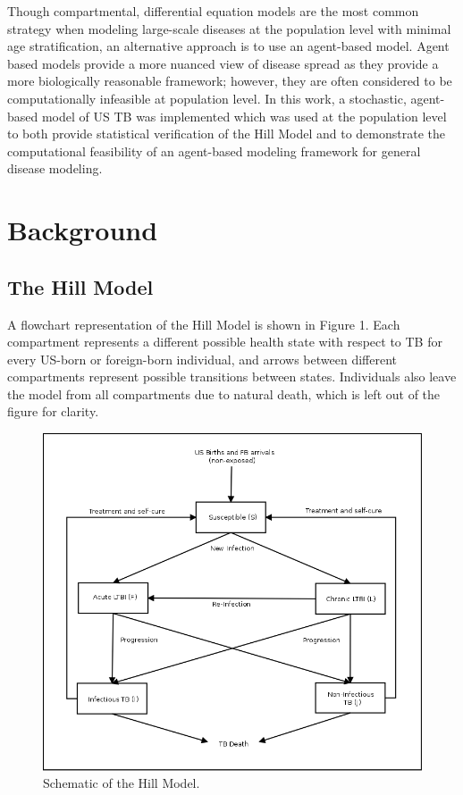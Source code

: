 \documentclass{amsart}
\begin{document}
Though compartmental, differential equation models are the most common strategy
when modeling large-scale diseases at the population level with minimal age
stratification, an alternative approach is to use an agent-based model. Agent
based models provide a more nuanced view of disease spread as they provide a
more biologically reasonable framework; however, they are often considered to be
computationally infeasible at population level. In this work, a stochastic,
agent-based model of US TB was implemented which was used at the population
level to both provide statistical verification of the Hill Model and to
demonstrate the computational feasibility of an agent-based modeling framework
for general disease modeling. 

\section{Background}

\subsection{The Hill Model}
A flowchart representation of the Hill Model is shown in Figure 1.  Each compartment
represents a different possible health state with respect to TB for every 
US-born or foreign-born individual, and arrows between different compartments
represent possible transitions between states.  Individuals also leave the model 
from all compartments due to natural death, which is left out of the figure for clarity.  \\

\begin{figure}[h]
  \begin{center}
    \includegraphics[scale=0.25]{figures/HillModelFlowChart.png}
  \end{center}
  \caption{Schematic of the Hill Model.}
  \label{fig:hillModelSchematic}
\end{figure}
\end{document}
